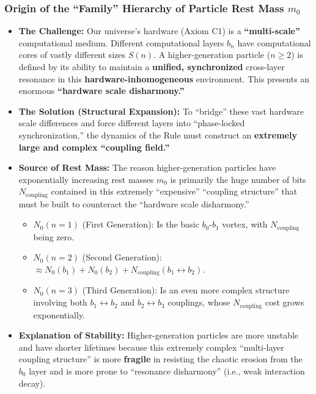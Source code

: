 \documentclass[11pt, a4paper]{article}
\begin{document}
\subsubsection*{Origin of the ``Family'' Hierarchy of Particle Rest Mass $m_0$}

\begin{itemize}
    \item \textbf{The Challenge:} Our universe's hardware (Axiom C1) is a \textbf{``multi-scale''} computational medium. Different computational layers $b_n$ have computational cores of vastly different sizes $S(n)$. A higher-generation particle ($n \ge 2$) is defined by its ability to maintain a \textbf{unified, synchronized} cross-layer resonance in this \textbf{hardware-inhomogeneous} environment. This presents an enormous \textbf{``hardware scale disharmony.''}

    \item \textbf{The Solution (Structural Expansion):} To ``bridge'' these vast hardware scale differences and force different layers into ``phase-locked synchronization,'' the dynamics of the Rule must construct an \textbf{extremely large and complex ``coupling field.''}

    \item \textbf{Source of Rest Mass:} The reason higher-generation particles have exponentially increasing rest masses $m_0$ is primarily the huge number of bits $N_{\text{coupling}}$ contained in this extremely ``expensive'' ``coupling structure'' that must be built to counteract the ``hardware scale disharmony.''
    \begin{itemize}
        \item $N_0(n=1)$ (First Generation): Is the basic $b_0$-$b_1$ vortex, with $N_{\text{coupling}}$ being zero.
        \item $N_0(n=2)$ (Second Generation): $\approx N_0(b_1) + N_0(b_2) + N_{\text{coupling}}(b_1 \leftrightarrow b_2)$.
        \item $N_0(n=3)$ (Third Generation): Is an even more complex structure involving both $b_1 \leftrightarrow b_2$ and $b_2 \leftrightarrow b_3$ couplings, whose $N_{\text{coupling}}$ cost grows exponentially.
    \end{itemize}

    \item \textbf{Explanation of Stability:} Higher-generation particles are more unstable and have shorter lifetimes because this extremely complex ``multi-layer coupling structure'' is more \textbf{fragile} in resisting the chaotic erosion from the $b_0$ layer and is more prone to ``resonance disharmony'' (i.e., weak interaction decay).


\end{itemize}
\end{document}
